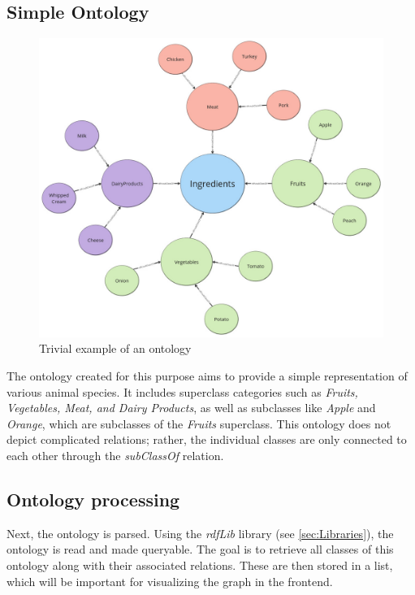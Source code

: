 \subsection{Simple Ontology}

\begin{figure}[H]
\includegraphics[scale=0.4]{Graphics/simple_ontology.jpg}
\caption{Trivial example of an ontology}
\end{figure}

The ontology created for this purpose aims to provide a simple representation of various animal species. It includes superclass categories such as \textit{Fruits, Vegetables, Meat, and Dairy Products}, as well as subclasses like \textit{Apple} and \textit{Orange}, which are subclasses of the \textit{Fruits} superclass. This ontology does not depict complicated relations; rather, the individual classes are only connected to each other through the \textit{subClassOf} relation.

\subsection{Ontology processing}
Next, the ontology is parsed. Using the \textit{rdfLib} library (see \ref{sec:Libraries}), the ontology is read and made queryable. The goal is to retrieve all classes of this ontology along with their associated relations. 
These are then stored in a list, which will be important for visualizing the graph in the frontend.

